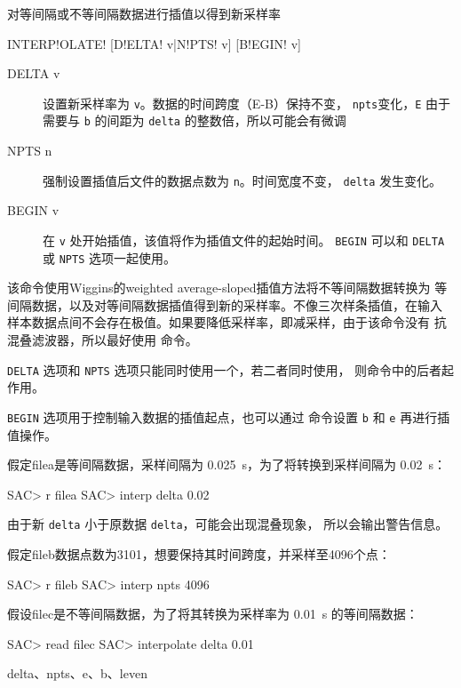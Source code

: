 \label{cmd:interpolate}

对等间隔或不等间隔数据进行插值以得到新采样率

\begin{SACSTX}
INTERP!OLATE! [D!ELTA! v|N!PTS! v] [B!EGIN! v]
\end{SACSTX}

\begin{description}
\item [DELTA v] 设置新采样率为 \texttt{v}。数据的时间跨度（E-B）保持不变，
    \texttt{npts}变化，\texttt{E} 由于需要与 \texttt{b} 的间距为 \texttt{delta}
    的整数倍，所以可能会有微调
\item [NPTS n] 强制设置插值后文件的数据点数为 \texttt{n}。时间宽度不变，
    \texttt{delta} 发生变化。
\item [BEGIN v] 在 \texttt{v} 处开始插值，该值将作为插值文件的起始时间。
    \texttt{BEGIN} 可以和 \texttt{DELTA} 或 \texttt{NPTS} 选项一起使用。
\end{description}

该命令使用Wiggins的weighted average-sloped插值方法将不等间隔数据转换为
等间隔数据，以及对等间隔数据插值得到新的采样率。不像三次样条插值，在输入
样本数据点间不会存在极值。如果要降低采样率，即减采样，由于该命令没有
抗混叠滤波器，所以最好使用  命令。

\texttt{DELTA} 选项和 \texttt{NPTS} 选项只能同时使用一个，若二者同时使用，
则命令中的后者起作用。

\texttt{BEGIN} 选项用于控制输入数据的插值起点，也可以通过 
命令设置 \texttt{b} 和 \texttt{e} 再进行插值操作。

假定filea是等间隔数据，采样间隔为 \SI{0.025}{\s}，为了将转换到采样间隔为
\SI{0.02}{\s}：
\begin{SACCode}
SAC> r filea
SAC> interp delta 0.02
\end{SACCode}
由于新 \texttt{delta} 小于原数据 \texttt{delta}，可能会出现混叠现象，
所以会输出警告信息。

假定fileb数据点数为3101，想要保持其时间跨度，并采样至4096个点：
\begin{SACCode}
SAC> r fileb
SAC> interp npts 4096
\end{SACCode}

假设filec是不等间隔数据，为了将其转换为采样率为 \SI{0.01}{\s} 的等间隔数据：
\begin{SACCode}
SAC> read filec
SAC> interpolate delta 0.01
\end{SACCode}

delta、npts、e、b、leven
